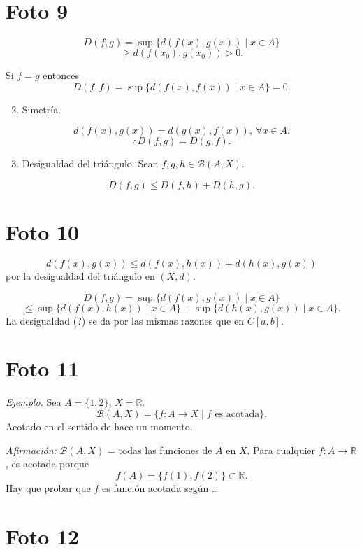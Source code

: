 \documentclass[12pt]{article}
\begin{document}
\section*{Foto 9}

\[
D(f,g)=\sup\{d(f(x),g(x))\mid x\in A\}
\]
\[
\ge d(f(x_0),g(x_0))>0.
\]

Si $f=g$ entonces
\[
D(f,f)=\sup\{d(f(x),f(x))\mid x\in A\}=0.
\]

\begin{enumerate}[label=\arabic*)]
    \setcounter{enumi}{1}
    \item Simetría.
\end{enumerate}

\[
d(f(x),g(x))=d(g(x),f(x)),\ \forall x\in A.
\]
\[
\therefore D(f,g)=D(g,f).
\]

\begin{enumerate}[label=\arabic*)]
    \setcounter{enumi}{2}
    \item Desigualdad del triángulo. Sean $f,g,h\in\mathcal B(A,X)$.
\end{enumerate}

\[
D(f,g)\le D(f,h)+D(h,g).
\]

\section*{Foto 10}

\[
d(f(x),g(x))\le d(f(x),h(x))+d(h(x),g(x))
\]
por la desigualdad del triángulo en $(X,d)$.

\[
D(f,g)=\sup\{d(f(x),g(x))\mid x\in A\}
\]
\[
\le \sup\{d(f(x),h(x))\mid x\in A\}+\sup\{d(h(x),g(x))\mid x\in A\}.
\]
La desigualdad (?) se da por las mismas razones que en $C[a,b]$.

\section*{Foto 11}

\textit{Ejemplo.} Sea $A=\{1,2\}$, $X=\mathbb R$.
\[
\mathcal B(A,X)=\{f:A\to X\mid f \text{ es acotada}\}.
\]
Acotado en el sentido de hace un momento.

\textit{Afirmación:} $\mathcal B(A,X)$ = todas las funciones de $A$ en $X$.
Para cualquier $f:A\to\mathbb R$, es acotada porque
\[
f(A)=\{f(1),f(2)\}\subset \mathbb R.
\]
Hay que probar que $f$ es función acotada según \dots

\section*{Foto 12}
\end{document}
